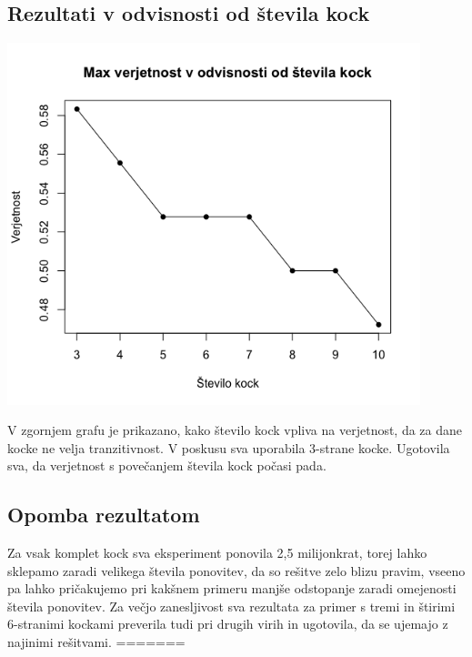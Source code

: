\documentclass[12pt,a4paper]{amsart}
\begin{document}
 \subsection{Rezultati v odvisnosti od števila kock}
\begin{center}
    \includegraphics*[width=120mm]{st_kock.png}
\end{center}
V zgornjem grafu je prikazano, kako število kock vpliva na verjetnost, da za dane kocke ne velja tranzitivnost. V poskusu sva uporabila 3-strane kocke. Ugotovila sva, da verjetnost s povečanjem števila kock počasi pada.

\subsection{Opomba rezultatom}
Za vsak komplet kock sva eksperiment ponovila 2,5 milijonkrat, torej lahko sklepamo zaradi velikega števila ponovitev, da so rešitve zelo blizu pravim, vseeno pa lahko pričakujemo pri kakšnem primeru manjše odstopanje zaradi omejenosti števila ponovitev. Za večjo zanesljivost sva rezultata za primer s tremi in štirimi 6-stranimi kockami preverila tudi pri drugih virih in ugotovila, da se ujemajo z najinimi rešitvami.
=======
\end{document}
